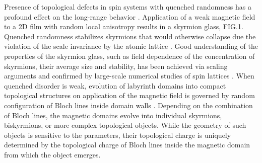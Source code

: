 Presence of topological defects in spin systems with quenched randomness has a profound effect on the long-range behavior \cite{Proctor_2014,Proctor_2015}. Application of a weak magnetic field to a 2D film with random local anisotropy results in a skyrmion glass, FIG.1. Quenched randomness stabilizes skyrmions that would otherwise collapse due the violation of the scale invariance by the atomic lattice \cite{Cai_2012}. Good understanding of the properties of the skyrmion glass, such as field dependence of the concentration of skyrmions, their average size and stability, has been achieved via scaling arguments and confirmed by large-scale numerical studies of spin lattices \cite{1710.10608v1}. When quenched disorder is weak, evolution of labyrinth domains into compact topological structures on application of the magnetic field is governed by random configuration of Bloch lines inside domain walls \cite{1706.02994v1}. Depending on the combination of Bloch lines, the magnetic domains evolve into individual skyrmions, biskyrmions, or more complex topological objects. While the geometry of such objects is sensitive to the parameters, their topological charge is uniquely determined by the topological charge of Bloch lines inside the magnetic domain from which the object emerges.